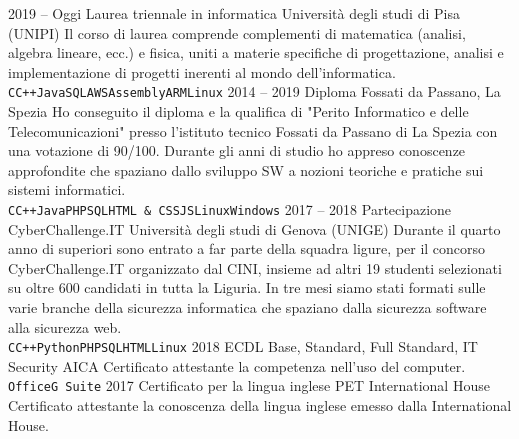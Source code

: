 \documentclass[9pt]{developercv} %
\begin{document}


\begin{entrylist}
	\entry
	{2019 -- Oggi}
	{Laurea triennale in informatica}
	{Università degli studi di Pisa (UNIPI)}
	{Il corso di laurea comprende complementi di matematica (analisi, algebra lineare, ecc.) e fisica, uniti a materie specifiche di progettazione, analisi e implementazione
		di progetti inerenti al mondo dell'informatica.\\
		\texttt{C}\slashsep\texttt{C++}\slashsep\texttt{Java}\slashsep\texttt{SQL}\slashsep\texttt{AWS}\slashsep\texttt{Assembly}\slashsep\texttt{ARM}\slashsep\texttt{Linux}}
	\entry
	{2014 -- 2019}
	{Diploma}
	{Fossati da Passano, La Spezia}
	{Ho conseguito il diploma e la qualifica di "Perito Informatico e delle Telecomunicazioni" presso l'istituto tecnico Fossati da Passano di La Spezia con una votazione di 90/100.
		Durante gli anni di studio ho appreso conoscenze approfondite che spaziano dallo sviluppo SW a nozioni teoriche e pratiche sui sistemi informatici.\\
		\texttt{C}\slashsep\texttt{C++}\slashsep\texttt{Java}\slashsep\texttt{PHP}\slashsep\texttt{SQL}\slashsep\texttt{HTML \& CSS}\slashsep\texttt{JS}\slashsep\texttt{Linux}\slashsep\texttt{Windows}}
	\entry
	{2017 -- 2018}
	{Partecipazione CyberChallenge.IT}
	{Università degli studi di Genova (UNIGE)}
	{Durante il quarto anno di superiori sono entrato a far parte della squadra ligure, per il concorso CyberChallenge.IT organizzato dal CINI, insieme ad altri 19 studenti selezionati su oltre
		600 candidati in tutta la Liguria. In tre mesi siamo stati formati sulle varie branche della sicurezza informatica che spaziano dalla sicurezza software alla sicurezza web.\\
		\texttt{C}\slashsep\texttt{C++}\slashsep\texttt{Python}\slashsep\texttt{PHP}\slashsep\texttt{SQL}\slashsep\texttt{HTML}\slashsep\texttt{Linux}}
	\entry
	{2018}
	{ECDL Base, Standard, Full Standard, IT Security}
	{AICA}
	{Certificato attestante la competenza nell'uso del computer.\\
		\texttt{Office}\slashsep\texttt{G Suite}}
	\entry
	{2017}
	{Certificato per la lingua inglese PET}
	{International House}
	{Certificato attestante la conoscenza della lingua inglese emesso dalla International House.}
\end{entrylist}
\end{document}

